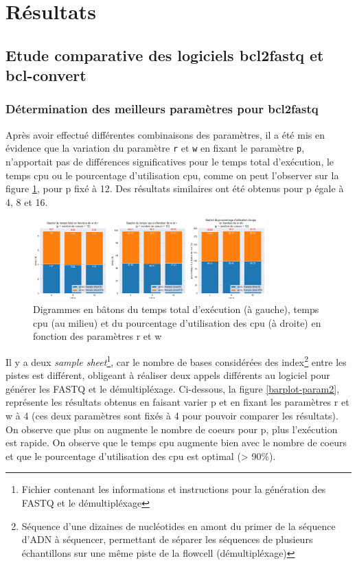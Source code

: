 \section{Résultats}
\subsection{Etude comparative des logiciels bcl2fastq et bcl-convert}
\subsubsection*{Détermination des meilleurs paramètres pour bcl2fastq}
Après avoir effectué différentes combinaisons des paramètres, il a été mis en évidence que la variation du paramètre \texttt{r} et \texttt{w} en fixant le paramètre \texttt{p}, n'apportait pas de différences significatives pour le temps total d'exécution, le temps cpu ou le pourcentage d'utilisation cpu, comme on peut l'observer sur la figure \ref{barplot-param}, pour p fixé à 12. Des résultats similaires ont été obtenus pour p égale à 4, 8 et 16. 

\begin{figure}[H]
    \centering
    \includegraphics[width=0.8\textwidth]{img/barplot_cum_jarvis2.png}
    \caption{\footnotesize{Digrammes en bâtons du temps total d'exécution (à gauche), temps cpu (au milieu) et du pourcentage d'utilisation des cpu (à droite) en fonction des paramètres r et w}}
    \label{barplot-param}
\end{figure}

Il y a deux \emph{sample sheet}\footnote{Fichier contenant les informations et instructions pour la génération des FASTQ et le démultipléxage}, car le nombre de bases considérées des index\footnote{Séquence d'une dizaines de nucléotides en amont du primer de la séquence d'ADN à séquencer, permettant de séparer les séquences de plusieurs échantillons sur une même piste de la flowcell (démultipléxage)} entre les pistes est différent, obligeant à réaliser deux appels différents au logiciel pour générer les FASTQ et le démultipléxage. Ci-dessous, la figure \ref{barplot-param2}, représente les résultats obtenus en faisant varier p et en fixant les paramètres r et w à 4 (ces deux paramètres sont fixés à 4 pour pouvoir comparer les résultats). On observe que plus on augmente le nombre de coeurs pour p, plus l'exécution est rapide. On observe que le temps cpu augmente bien avec le nombre de coeurs et que le pourcentage d'utilisation des cpu est optimal (> 90\%).

